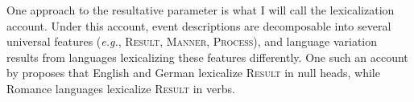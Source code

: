 \documentclass[MilwayThesis]{subfiles}
\begin{document}
One approach to the resultative parameter is what I will call the lexicalization account.
Under this account, event descriptions are decomposable into several universal features (\textit{e.g.}, \textsc{Result}, \textsc{Manner}, \textsc{Process}), and language variation results from languages lexicalizing these features differently.
One such an account by \textcite{son2008microparameters} proposes that English and German lexicalize \textsc{Result} in null heads, while Romance languages lexicalize \textsc{Result} in verbs.
\end{document}
